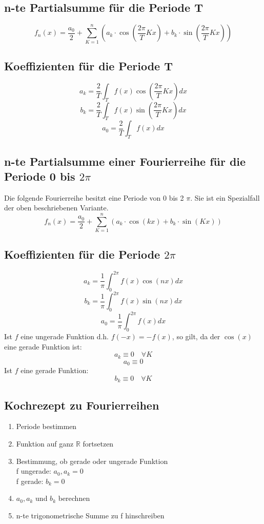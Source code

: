\subsection{n-te Partialsumme für die Periode T}
\[ \boxed{f_n(x) = \frac{a_0}{2} + \sum_{K=1}^n \left(a_k \cdot \cos \left(\frac{2 \pi}{T} K x\right) + b_k \cdot \sin\left(\frac{2 \pi}{T} K x\right)\right)} \]

\subsection{Koeffizienten für die Periode T}
\[ \boxed{a_k = \frac{2}{T} \int_T f(x) \cos(\frac{2 \pi}{T} K x) dx} \]
\[ \boxed{b_k = \frac{2}{T} \int_T f(x) \sin(\frac{2 \pi}{T} K x) dx} \]
\[ \boxed{a_0 = \frac{2}{T} \int_T f(x) dx
} \]

\subsection{n-te Partialsumme einer Fourierreihe für die Periode 0 bis $2\pi$}
Die folgende Fourierreihe besitzt eine Periode von 0 bis 2 $\pi$.
Sie ist ein Spezialfall der oben beschriebenen Variante.
\[ \boxed{f_n(x) = \frac{a_0}{2} + \sum_{K=1}^n \left(a_k \cdot \cos(kx) + b_k \cdot \sin(Kx)\right)} \]

\subsection{Koeffizienten für die Periode $2\pi$}
\[ \boxed{a_k = \frac{1}{\pi} \int_0^{2 \pi} f(x) \cos(nx) dx} \]
\[ \boxed{b_k = \frac{1}{\pi} \int_0^{2 \pi} f(x) \sin(nx) dx} \]
\[ \boxed{a_0 = \frac{1}{\pi} \int_0^{2 \pi} f(x) dx
} \]
Ist $f$ eine ungerade Funktion d.h. $f(-x) = -f(x)$, so gilt, da der $\cos(x)$ eine gerade Funktion ist: 
\[ a_k \equiv 0 \quad \forall K\]
\[ a_0 \equiv 0 \]
Ist $f$ eine gerade Funktion: 
\[ b_k \equiv 0 \quad \forall K \]

\subsection{Kochrezept zu Fourierreihen}
\begin{enumerate}
  \item Periode bestimmen
  \item Funktion auf ganz $\mathbb{R}$ fortsetzen
  \item Bestimmung, ob gerade oder ungerade Funktion\\
  f ungerade: $a_0, a_k = 0$\\
  f gerade: $b_k = 0$
  \item $a_0, a_k$ und $b_k$ berechnen
  \item n-te trigonometrische Summe zu f hinschreiben
\end{enumerate}

